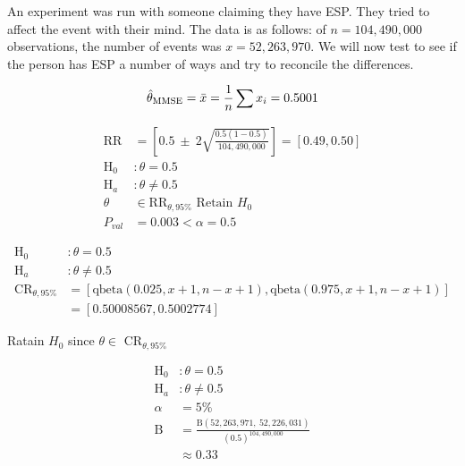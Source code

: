 \documentclass[12pt]{article}
\begin{document}
An experiment was run with someone claiming they have ESP. They tried to affect the event with their mind. The data is as follows: of $n= 104,490,000$ observations, the number of events was $x = 52,263,970$. We will now test to see if the person has ESP a number of ways and try to reconcile the differences.

\begin{enumerate}


\begin{align*}
    \hat{\theta}_{\mathrm{MMSE}} = \bar{x} = \frac{1}{n} \sum x_i = 0.5001
\end{align*}


\begin{align*}
    \text{RR} &= [0.5 ~\pm~ 2\sqrt{\frac{0.5(1-0.5)}{104, 490, 000}}] = [0.49, 0.50] \\ 
    \text{H}_0 &: \theta = 0.5 \\ 
    \text{H}_a &: \theta \neq 0.5 \\ 
    \theta &\in \text{RR}_{\theta, 95\%} \text{ Retain $H_0$ } \\ 
    P_{val} &= 0.003 < \alpha = 0.5
\end{align*}


\begin{align*}
    \text{H}_0 &: \theta = 0.5 \\ 
    \text{H}_a &: \theta \neq 0.5 \\ 
   \text{CR}_{\theta, 95\%} &= [\text{qbeta}(0.025, x + 1, n - x + 1), \text{qbeta}(0.975, x+1, n-x+1)] \\ 
    &= [0.50008567, 0.5002774]
\end{align*}

Ratain $H_0$ since $\theta \in $ CR$_{\theta, 95\%}$ 


\begin{align*}
    \text{H}_0 &: \theta = 0.5 \\ 
    \text{H}_a &: \theta \neq 0.5 \\ 
    \alpha &= 5\% \\ 
    \text{B} &= \frac{\text{B}(52,263,971, ~52,226,031)}{(0.5)^{104, 490, 000}} \\
    &\approx 0.33
\end{align*}


\end{enumerate}
\end{document}
